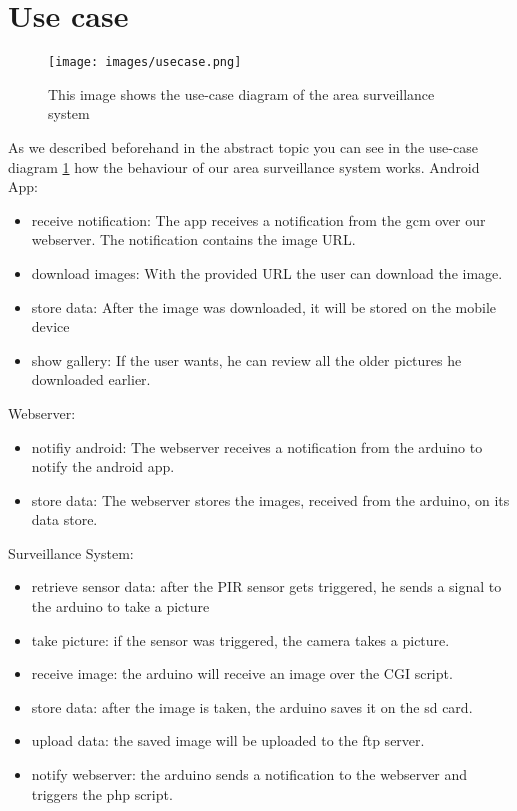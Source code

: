 \section[Use Case - Team]{Use case}

\begin{figure}[H]
	\centering
	\texttt{[image: images/usecase.png]}
	\caption[Use-case diagram]{This image shows the use-case diagram of the area surveillance system}
	\label{usecase}
\end{figure}


As we described beforehand in the abstract topic you can see in the use-case diagram \ref{usecase} how the behaviour of our area surveillance system works.
Android App:
\begin{itemize}
\item receive notification: The app receives a notification from the gcm over our webserver. The notification contains the image URL.
\item download images: With the provided URL the user can download the image.
\item store data: After the image was downloaded, it will be stored on the mobile device
\item show gallery: If the user wants, he can review all the older pictures he downloaded earlier.
\end{itemize}

Webserver:
\begin{itemize}
\item notifiy android: The webserver receives a notification from the arduino to notify the android app.
\item store data: The webserver stores the images, received from the arduino, on its data store.
\end{itemize}

Surveillance System:
\begin{itemize}
\item retrieve sensor data: after the PIR sensor gets triggered, he sends a signal to the arduino to take a picture
\item take picture: if the sensor was triggered, the camera takes a picture.
\item receive image: the arduino will receive an image over the CGI script.
\item store data: after the image is taken, the arduino saves it on the sd card.
\item upload data: the saved image will be uploaded to the ftp server.
\item notify webserver: the arduino sends a notification to the webserver and triggers the php script.

\end{itemize}


